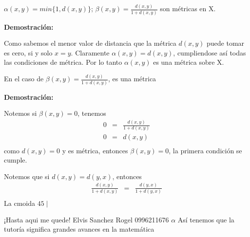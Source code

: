 \documentclass[
]{article}
\begin{document}
\(\alpha (x,y)=min \{1,d(x,y)\}\);
\(\beta (x,y)= \frac{d(x,y)}{1+d(x,y)}\) son métricas en X.

\textbf{Demostración:}

Como sabemos el menor valor de distancia que la métrica \(d(x,y)\) puede
tomar es cero, si y solo \(x=y\). Claramente \(\alpha (x,y)=d(x,y)\),
cumpliendose así todas las condiciones de métrica. Por lo tanto
\(\alpha (x,y)\) es una métrica sobre X.

En el caso de \(\beta (x,y)= \frac{d(x,y)}{1+d(x,y)}\), es una métrica

\textbf{Demostración:}

Notemos si \(\beta (x,y)=0\), tenemos \begin{eqnarray*}
0 & = & \frac{d(x,y)}{1+d(x,y)}\\
0 & = & d(x,y)\\
\end{eqnarray*} como \(d(x,y)=0\) y es métrica, entonces
\(\beta (x,y)=0\), la primera condición se cumple.

Notemos que si \(d(x,y)=d(y,x)\), entonces \begin{eqnarray*}
\frac{d(x,y)}{1+d(x,y)} & = & \frac{d(y,x)}{1+d(y,x)}\\
\end{eqnarray*} La cmoida \(45 \mid\)

¡Hasta aqui me quede! Elvis Sanchez Rogel 0996211676 \(\alpha\) Así
tenemos que la tutoría significa grandes avances en la matemática
\end{document}
